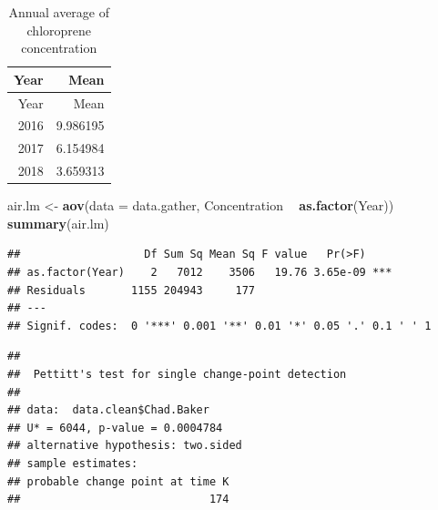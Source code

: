\documentclass[12pt,]{article}
\newenvironment{Shaded}{\begin{snugshade}}{\end{snugshade}}
\newcommand{\KeywordTok}[1]{\textcolor[rgb]{0.13,0.29,0.53}{\textbf{#1}}}
\newcommand{\DataTypeTok}[1]{\textcolor[rgb]{0.13,0.29,0.53}{#1}}
\newcommand{\StringTok}[1]{\textcolor[rgb]{0.31,0.60,0.02}{#1}}
\newcommand{\CommentTok}[1]{\textcolor[rgb]{0.56,0.35,0.01}{\textit{#1}}}
\newcommand{\OperatorTok}[1]{\textcolor[rgb]{0.81,0.36,0.00}{\textbf{#1}}}
\newcommand{\NormalTok}[1]{#1}
\begin{document}
\begin{longtable}[]{@{}rr@{}}
\caption{Annual average of chloroprene concentration}\tabularnewline
\toprule
Year & Mean\tabularnewline
\midrule
\endfirsthead
\toprule
Year & Mean\tabularnewline
\midrule
\endhead
2016 & 9.986195\tabularnewline
2017 & 6.154984\tabularnewline
2018 & 3.659313\tabularnewline
\bottomrule
\end{longtable}

\begin{Shaded}
\begin{Highlighting}[]
\NormalTok{air.lm <-}\StringTok{ }\KeywordTok{aov}\NormalTok{(}\DataTypeTok{data =}\NormalTok{ data.gather,  Concentration }\OperatorTok{~}\StringTok{ }\KeywordTok{as.factor}\NormalTok{(Year))}
\KeywordTok{summary}\NormalTok{(air.lm)}
\end{Highlighting}
\end{Shaded}

\begin{verbatim}
##                   Df Sum Sq Mean Sq F value   Pr(>F)    
## as.factor(Year)    2   7012    3506   19.76 3.65e-09 ***
## Residuals       1155 204943     177                     
## ---
## Signif. codes:  0 '***' 0.001 '**' 0.01 '*' 0.05 '.' 0.1 ' ' 1
\end{verbatim}

\begin{Shaded}
\end{Shaded}

\begin{verbatim}
## 
##  Pettitt's test for single change-point detection
## 
## data:  data.clean$Chad.Baker
## U* = 6044, p-value = 0.0004784
## alternative hypothesis: two.sided
## sample estimates:
## probable change point at time K 
##                             174
\end{verbatim}

\begin{Shaded}
\end{Shaded}
\end{document}
